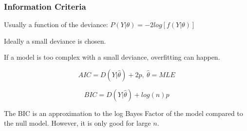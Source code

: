 \documentclass[11pt]{article}
\begin{document}
\subsubsection{Information Criteria}
\label{sec:orgabc0b95}

Usually a function of the deviance: \(P(Y | \theta) = -2 log \left[ f(Y | \theta)
\right]\)

Ideally a small deviance is chosen.

If a model is too complex with a small deviance, overfitting can happen.

$$
AIC = D(Y | \hat \theta) + 2p, \ \hat \theta = MLE
$$

$$
BIC = D(Y | \hat \theta) + log(n) p
$$

The BIC is an approximation to the log Bayes Factor of the model compared to the
null model. However, it is only good for large \(n\).
\end{document}
